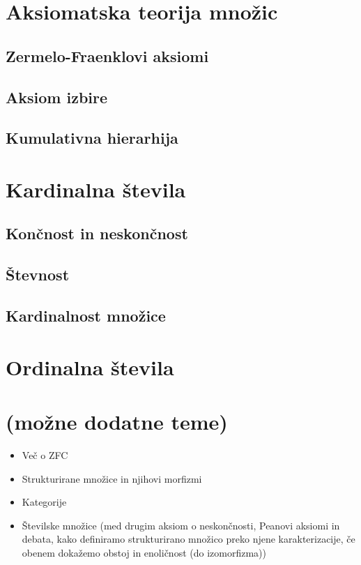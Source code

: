 \documentclass[11pt,a4paper,twoside]{book}
\newcommand{\note}[1]{{\small\textcolor{notecolor}{(#1)}}}
\begin{document}
	
	
	\chapter{Aksiomatska teorija množic}
		\section{Zermelo-Fraenklovi aksiomi}
		\section{Aksiom izbire}
		\section{Kumulativna hierarhija}
	
	\chapter{Kardinalna števila}
		\section{Končnost in neskončnost}
		\section{Števnost}
		\section{Kardinalnost množice}
	
	\chapter{Ordinalna števila}
	
	\chapter{\note{možne dodatne teme}}
		\begin{itemize}
			\item
				Več o ZFC
			\item
				Strukturirane množice in njihovi morfizmi
			\item
				Kategorije
			\item
				Številske množice (med drugim aksiom o neskončnosti, Peanovi aksiomi in debata, kako definiramo strukturirano množico preko njene karakterizacije, če obenem dokažemo obstoj in enoličnost (do izomorfizma))
		\end{itemize}
	
	
\end{document}
